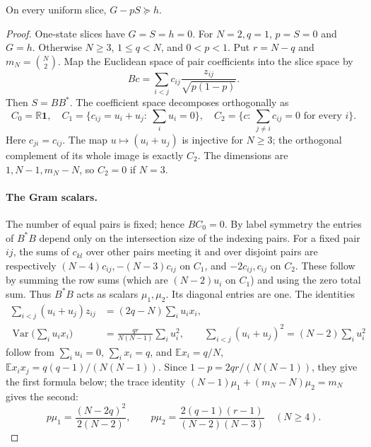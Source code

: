 \begin{lemma}\label{sl:weighted}
On every uniform slice, $G-pS\succeq h$.
\end{lemma}
\begin{proof}
One-state slices have $G=S=h=0$. For $N=2,q=1$, $p=S=0$ and $G=h$.
Otherwise $N\ge3$, $1\le q<N$, and $0<p<1$. Put $r=N-q$ and $m_N=\binom N2$.
Map the Euclidean space of pair coefficients into the slice space by
\[
 Bc=\sum_{i<j}c_{ij}\frac{z_{ij}}{\sqrt{p(1-p)}}.
\]
Then $S=BB^*$. The coefficient space decomposes orthogonally as
\[
 C_0=\mathbb R\mathbf 1,\quad C_1=\{c_{ij}=u_i+u_j:\ \sum_i u_i=0\},\quad
 C_2=\{c:\ \sum_{j\ne i}c_{ij}=0\text{ for every }i\}.
\]
Here $c_{ji}=c_{ij}$. The map $u\mapsto(u_i+u_j)$ is injective for $N\ge3$;
the orthogonal complement of its whole image is exactly $C_2$.
The dimensions are $1,N-1,m_N-N$, so $C_2=0$ if $N=3$.

\paragraph{The Gram scalars.}
The number of equal pairs is fixed; hence $BC_0=0$. By label symmetry the
entries of $B^*B$ depend only on the intersection size of the indexing pairs.
For a fixed pair $ij$, the sums of $c_{kl}$ over other pairs meeting it and
over disjoint pairs are respectively
$(N-4)c_{ij},-(N-3)c_{ij}$ on $C_1$, and $-2c_{ij},c_{ij}$ on $C_2$.
These follow by summing the row sums (which are $(N-2)u_i$ on $C_1$)
and using the zero total sum. Thus $B^*B$ acts as scalars $\mu_1,\mu_2$.
Its diagonal entries are one. The identities
\begin{align*}
 \sum_{i<j}(u_i+u_j)z_{ij}&=(2q-N)\sum_i u_ix_i,\\
 \operatorname{Var}\Big(\sum_i u_ix_i\Big)&=\frac{qr}{N(N-1)}\sum_i u_i^2,\qquad
 \sum_{i<j}(u_i+u_j)^2=(N-2)\sum_i u_i^2
\end{align*}
follow from $\sum_i u_i=0$, $\sum_i x_i=q$, and
$\mathbb E x_i=q/N$, $\mathbb E x_ix_j=q(q-1)/(N(N-1))$. Since
$1-p=2qr/(N(N-1))$, they give the first formula below; the trace identity
$(N-1)\mu_1+(m_N-N)\mu_2=m_N$ gives the second:
\[
 p\mu_1=\frac{(N-2q)^2}{2(N-2)},\qquad
 p\mu_2=\frac{2(q-1)(r-1)}{(N-2)(N-3)}\quad(N\ge4).
\]


\end{proof}
